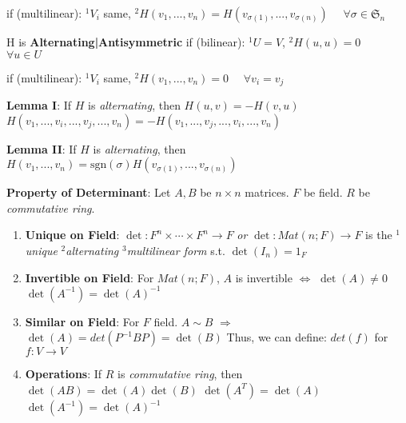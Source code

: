 \documentclass[9pt]{article}
\begin{document}
\hspace{78pt} if (multilinear): $^1V_i$ same, \quad $^2H(v_1,...,v_n)=H(v_{\sigma(1)},...,v_{\sigma(n)})$ \ \ $\forall \sigma\in\mathfrak{S}_n$

\quad H is \textbf{Alternating|Antisymmetric} if (bilinear): $^1U=V$, \quad $^2H(u,u)=0$ \ \ $\forall u\in U$

\hspace{153pt} if (multilinear): $^1V_i$ same, \quad $^2H(v_1,...,v_n)=0$ \ \ $\forall v_i=v_j$ 

\quad \textbf{Lemma I}: If $H$ is \textit{alternating}, then \quad $H(u,v)=-H(v,u)$ \qquad $H(v_1,...,v_i,...,v_j,...,v_n)=-H(v_1,...,v_j,...,v_i,...,v_n)$ 

\quad \textbf{Lemma II}: If $H$ is \textit{alternating}, then \quad $H(v_1,...,v_n)=\text{sgn}(\sigma)H(v_{\sigma(1)},...,v_{\sigma(n)})$ 

\textbf{Property of Determinant}: Let $A,B$ be $n\times n$ matrices. \quad $F$ be field. \quad $R$ be \textit{commutative ring}.
\begin{enumerate}[itemsep=-2pt, topsep=-2pt]
    \item \textbf{Unique on Field}: $\det:F^n\times \cdots\times F^n\to F$ \textit{or} $\det: Mat(n;F) \to F$ is the $^1$\textit{unique} $^2$\textit{alternating} $^3$\textit{multilinear form} s.t. $\det(I_n)=1_F$
    \item \textbf{Invertible on Field}: For $Mat(n;F)$, $A$ is invertible $\Leftrightarrow$ $\det(A)\ne0$ \quad $\det(A^{-1})=\det(A)^{-1}$ 
    \item \textbf{Similar on Field}: For $F$ field. \quad $A\sim B$ $\Rightarrow$ $\det(A)=det(P^{-1}BP)=\det(B)$ \qquad Thus, we can define: $det(f)$ for $f:V\to V$
    \item \textbf{Operations}: {\scriptsize If $R$ is \textit{commutative ring}}, then $\det(AB)=\det(A)\det(B)$ \quad $\det(A^T)=\det(A)$  \quad $\det(A^{-1})=\det(A)^{-1}$
\end{enumerate}
\end{document}
